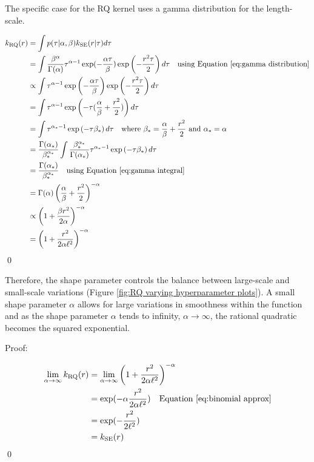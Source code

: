\documentclass[12pt,a4paper]{article}
\begin{document}
The specific case for the RQ kernel uses a gamma distribution for the length-scale.

\begin{align*}
k_\text{RQ}(r) &= \int p(\tau|\alpha, \beta) k_{\text{SE}}(r|\tau) d\tau \\
&= \int \frac{\beta^{\alpha}}{\Gamma(\alpha)} \tau^{\alpha - 1} \exp(-\frac{\alpha\tau}{\beta})  \exp\left(-\frac{r^2 \tau}{2}\right) d\tau \quad \text{using Equation \eqref{eq:gamma distribution}}\\
& \propto \int \tau^{\alpha-1} \exp\left(-\frac{\alpha \tau}{\beta}\right) \exp\left(-\frac{r^2 \tau}{2}\right) d\tau  \\
&= \int \tau^{\alpha-1} \exp\left(-\tau(\frac{\alpha}{\beta} + \frac{r^2}{2})\right)  d\tau  \\
&= \int \tau^{\alpha_*-1} \exp\left(-\tau \beta_*\right)  d\tau \quad \text{where } \beta_* = \frac{\alpha}{\beta} + \frac{r^2}{2} \text{ and } \alpha_*=\alpha \\
&= \frac{\Gamma(\alpha_*)}{\beta_{*}^{\alpha_*}} \int \frac{\beta_{*}^{\alpha_*}}{\Gamma(\alpha_*)} \tau^{\alpha_*-1} \exp\left(-\tau \beta_*\right)  d\tau  \\
&= \frac{\Gamma(\alpha_*)}{\beta_{*}^{\alpha_*}} \quad \text{using Equation \eqref{eq:gamma integral}} \\
&= \Gamma(\alpha) \left(\frac{\alpha}{\beta} + \frac{r^2}{2}\right)^{-\alpha} \\
& \propto \left( 1 + \frac{\beta r^2}{2\alpha} \right)^{-\alpha} \\
&= \left( 1 + \frac{r^2}{2\alpha \ell^2} \right)^{-\alpha} \\
\end{align*}
\qed

Therefore, the shape parameter controls the balance between large-scale and small-scale variations (Figure \ref{fig:RQ varying hyperparameter plots}). A small shape parameter \( \alpha \) allows for large variations in smoothness within the function and as the shape parameter \( \alpha \) tends to infinity, \(\alpha \to \infty\), the rational quadratic becomes the squared exponential.

Proof:

\begin{align*}
\lim_{\alpha \to \infty} k_\text{RQ}(r) &= \lim_{\alpha \to \infty} \left( 1 + \frac{r^2}{2\alpha \ell^2} \right)^{-\alpha} \\
&= \exp(- \alpha \frac{r^2}{2 \alpha \ell^2}) \quad \text{Equation  \eqref{eq:binomial approx}}  \\
&= \exp(- \frac{r^2}{2 \ell^2}) \\
&= k_\text{SE}(r)
\end{align*}
\hfill \qed
\end{document}
